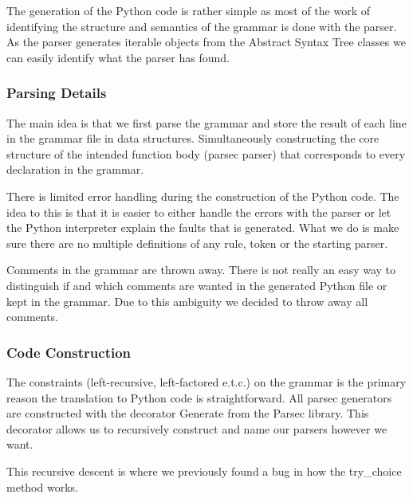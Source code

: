 The generation of the Python code is rather simple as most of the work of identifying the structure and semantics of the grammar is done with the parser. As the parser generates iterable objects from the Abstract Syntax Tree classes we can easily identify what the parser has found.


\subsubsection{Parsing Details}

The main idea is that we first parse the grammar and store the result of each line in the grammar file in data structures. Simultaneously constructing the core structure of the intended function body (parsec parser) that corresponds to every declaration in the grammar.

There is limited error handling during the construction of the Python code. The idea to this is that it is easier to either handle the errors with the parser or let the Python interpreter explain the faults that is generated. What we do is make sure there are no multiple definitions of any rule, token or the starting parser.

Comments in the grammar are thrown away. There is not really an easy way to distinguish if and which comments are wanted in the generated Python file or kept in the grammar. Due to this ambiguity we decided to throw away all comments.

\subsubsection{Code Construction}

The constraints (left-recursive, left-factored e.t.c.) on the grammar is the primary reason the translation to Python code is straightforward. All parsec generators are constructed with the decorator Generate from the Parsec library. This decorator allows us to recursively construct and name our parsers however we want.

This recursive descent is where we previously found a bug in how the try\_choice method works.

